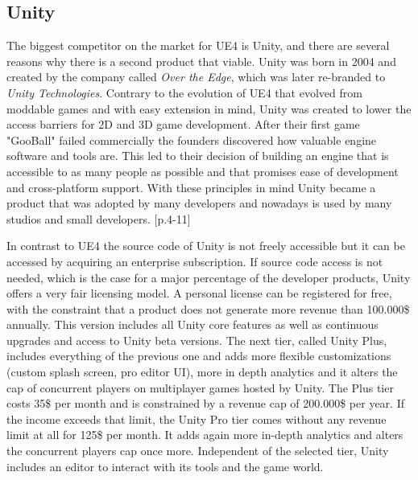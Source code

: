 \subsection{Unity}

The biggest competitor on the market for \ac{UE4} is Unity, and there are several reasons why there is a second product that viable. Unity was born in 2004 and created by the company called \textit{Over the Edge}, which was later re-branded to \textit{Unity Technologies}. Contrary to the evolution of \ac{UE4} that evolved from moddable games and with easy extension in mind, Unity was created to lower the access barriers for 2D and 3D game development. After their first game "GooBall" failed commercially the founders discovered how valuable engine software and tools are. This led to their decision of building an engine that is accessible to as many people as possible and that promises ease of development and cross-platform support. With these principles in mind Unity became a product that was adopted by many developers and nowadays is used by many studios and small developers. \cite{Unity_His}[p.4-11]

In contrast to \ac{UE4} the source code of Unity is not freely accessible but it can be accessed by acquiring an enterprise subscription. If source code access is not needed, which is the case for a major percentage of the developer products, Unity offers a very fair licensing model. A personal license can be registered for free, with the constraint that a product does not generate more revenue than 100.000\$ annually. This version includes all Unity core features as well as continuous upgrades and access to Unity beta versions. The next tier, called Unity Plus, includes everything of the previous one and adds more flexible customizations (custom splash screen, pro editor UI), more in depth analytics and it alters the cap of concurrent players on multiplayer games hosted by Unity. The Plus tier costs 35\$ per month and is constrained by a revenue cap of 200.000\$ per year. If the income exceeds that limit, the Unity Pro tier comes without any revenue limit at all for 125\$ per month. It adds again more in-depth analytics and alters the concurrent players cap once more. Independent of the selected tier, Unity includes an editor to interact with its tools and the game world. \cite{Unity_Tiers}

\clearpage

